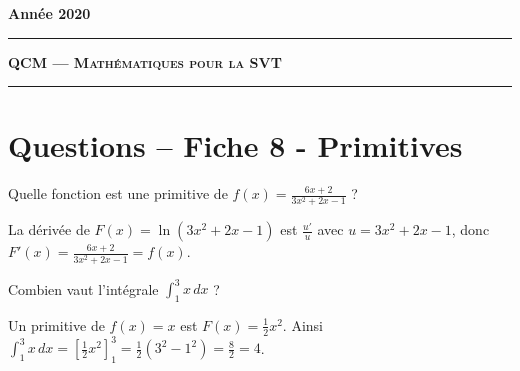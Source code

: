 \documentclass[12pt,a4paper]{article}
\begin{document}
 
 


\hfill\textbf{Ann\'ee 2020}

\vspace*{0.5ex}
\hrule\vspace*{1.5ex} 
\hfil\textsc{\textbf{\Large QCM --- Mathématiques pour la SVT}}
\vspace*{1ex} \hrule 
\vspace*{5ex} 

\section{Questions -- Fiche 8 - Primitives}

\begin{question}
Quelle fonction est une primitive de $f(x) = \frac{6x+2}{3x^2+2x-1}$ ?
\begin{answers}



\end{answers}

\begin{explanations}
La dérivée de $F(x) = \ln(3x^2+2x-1)$ est $\frac{u'}{u}$ avec $u=3x^2+2x-1$, 
donc $F'(x) = \frac{6x+2}{3x^2+2x-1} = f(x)$. 
\end{explanations}

\end{question}


\begin{question}
Combien vaut l'intégrale $\int_1^3 x \, dx$ ?
\begin{answers}



\end{answers}

\begin{explanations}
Un primitive de $f(x) = x$ est $F(x) = \frac12x^2$.
Ainsi $\int_1^3 x \, dx 
= \left[ \frac12x^2 \right]_1^3 
= \frac12\left( 3^2-1^2 \right) 
= \frac82 = 4$.
\end{explanations}

\end{question}
\end{document}
